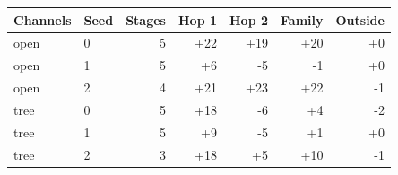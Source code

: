 \begin{tabular}{@{}llrrrrr@{}}
\toprule
Channels & Seed & Stages & Hop 1 & Hop 2 & Family & Outside \\
\midrule
open & 0 & 5 & +22 & +19 & +20 & +0 \\
open & 1 & 5 & +6 & -5 & -1 & +0 \\
open & 2 & 4 & +21 & +23 & +22 & -1 \\
tree & 0 & 5 & +18 & -6 & +4 & -2 \\
tree & 1 & 5 & +9 & -5 & +1 & +0 \\
tree & 2 & 3 & +18 & +5 & +10 & -1 \\
\bottomrule
\end{tabular}
